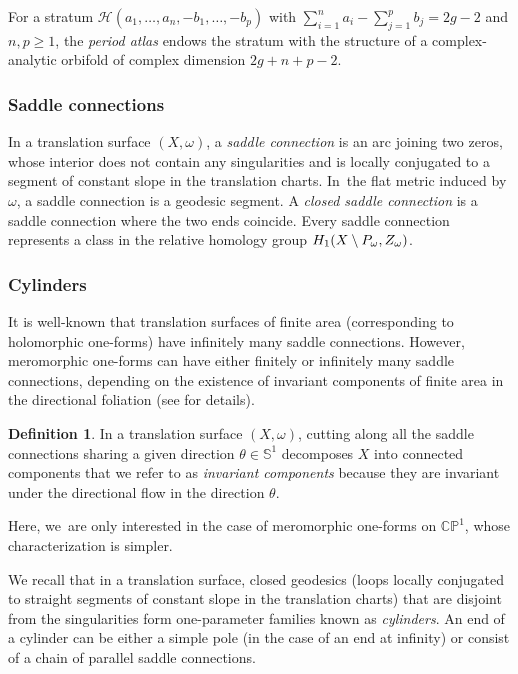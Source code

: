 \documentclass[11pt]{article}
\theoremstyle{definition}
\newtheorem{defn}[thm]{Definition}
\begin{document}
For a stratum $\mathcal{H}(a_{1},\dots,a_{n},-b_{1},\dots,-b_{p})$ with $\sum_{i=1}^n a_{i} - \sum_{j=1}^p b_{j} =2g-2$ and $n,p \geq 1$, the \textit{period atlas} endows the stratum with the structure of a complex-analytic orbifold of complex dimension $2g+n+p-2$.

\subsubsection{Saddle connections}

In a translation surface $(X,\omega)$, a \textit{saddle connection} is an arc joining two zeros, whose interior does not contain any singularities and is locally conjugated to a segment of constant slope in the translation charts. In~the flat metric induced by $\omega$, a saddle connection is a geodesic segment. A \textit{closed saddle connection} is a saddle connection where the two ends coincide.
Every saddle connection represents a class in the relative homology group $H_{1}(X \setminus\nobreak P_{\omega}, Z_{\omega})$.

\subsubsection{Cylinders}

It is well-known that translation surfaces of finite area (corresponding to holomorphic one-forms) have infinitely many saddle connections. However, meromorphic one-forms can have either finitely or infinitely many saddle connections, depending on the existence of invariant components of finite area in the directional foliation (see \cite[\S5]{tahar} for details).

\begin{defn}
In a translation surface $(X,\omega)$, cutting along all the saddle connections sharing a given direction $\theta \in \mathbb{S}^{1}$ decomposes $X$ into connected components that we refer to as \textit{invariant components} because they are invariant under the directional flow in the direction $\theta$.
\end{defn}

Here, we~are only interested in the case of meromorphic one-forms on $\mathbb{CP}^{1}$, whose characterization is simpler.

We recall that in a translation surface, closed geodesics (loops locally conjugated to straight segments of constant slope in the translation charts) that are disjoint from the singularities form one-parameter families known as \textit{cylinders}. An end of a cylinder can be either a simple pole (in the case of an end at infinity) or consist of a chain of parallel saddle connections.
\end{document}
